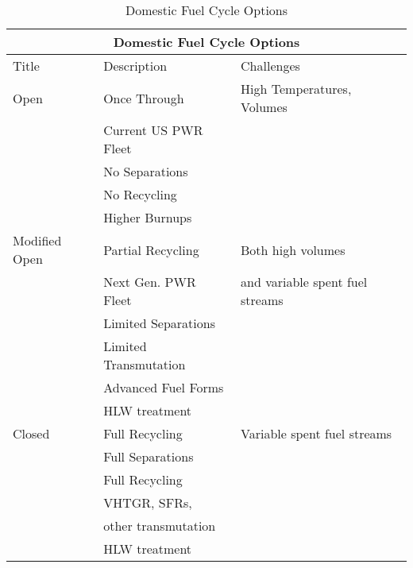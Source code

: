     \begin{table}
      \centering
      \footnotesize{
      \begin{tabular}{|l|l|l|}
        \multicolumn{3}{c}{\textbf{Domestic Fuel Cycle Options}}\\
        \hline
        Title & Description& Challenges \\
        \hline
        \hline
        Open          & Once Through         & High Temperatures, Volumes \\
                      & Current US PWR Fleet &      \\
                      & No Separations       &      \\
                      & No Recycling         &      \\
                      & Higher Burnups &      \\
        \hline
        Modified Open & Partial Recycling     & Both high volumes \\
                      & Next Gen. PWR Fleet   &   and variable spent fuel streams \\
                      & Limited Separations   &      \\
                      & Limited Transmutation &      \\
                      & Advanced Fuel Forms   &      \\
                      & HLW treatment         &      \\
        \hline
        Closed        & Full Recycling       & Variable spent fuel streams \\
                      & Full Separations &      \\
                      & Full Recycling &      \\
                      & VHTGR, SFRs, &      \\
                      & other transmutation & \\
                      & HLW treatment  &      \\
        \hline
      \end{tabular}
      \caption[Fuel Cycle Options]{Domestic Fuel Cycle Options }
      \label{tab:fco}
      }
    \end{table}

